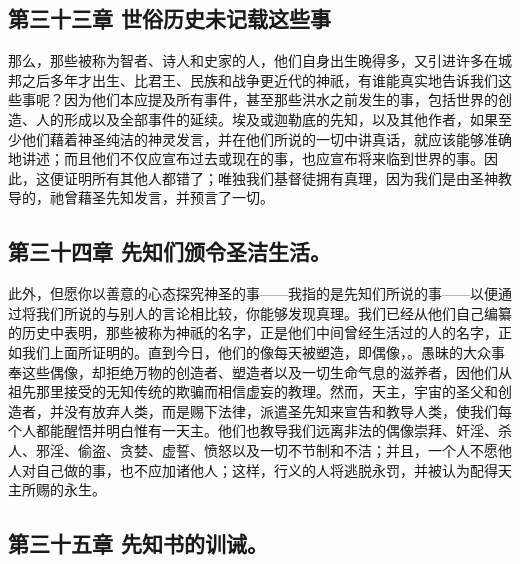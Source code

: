 
\subsection{第三十三章 世俗历史未记载这些事}

那么，那些被称为智者、诗人和史家的人，他们自身出生晚得多，又引进许多在城邦之后多年才出生、比君王、民族和战争更近代的神祇，有谁能真实地告诉我们这些事呢？因为他们本应提及所有事件，甚至那些洪水之前发生的事，包括世界的创造、人的形成以及全部事件的延续。埃及或迦勒底的先知，以及其他作者，如果至少他们藉着神圣纯洁的神灵发言，并在他们所说的一切中讲真话，就应该能够准确地讲述；而且他们不仅应宣布过去或现在的事，也应宣布将来临到世界的事。因此，这便证明所有其他人都错了；唯独我们基督徒拥有真理，因为我们是由圣神教导的，祂曾藉圣先知发言，并预言了一切。\par


\subsection{第三十四章 先知们颁令圣洁生活。}

此外，但愿你以善意的心态探究神圣的事——我指的是先知们所说的事——以便通过将我们所说的与别人的言论相比较，你能够发现真理。我们已经从他们自己编纂的历史中表明，那些被称为神祇的名字，正是他们中间曾经生活过的人的名字，正如我们上面所证明的。直到今日，他们的像每天被塑造，即偶像，。愚昧的大众事奉这些偶像，却拒绝万物的创造者、塑造者以及一切生命气息的滋养者，因他们从祖先那里接受的无知传统的欺骗而相信虚妄的教理。然而，天主，宇宙的圣父和创造者，并没有放弃人类，而是赐下法律，派遣圣先知来宣告和教导人类，使我们每个人都能醒悟并明白惟有一天主。他们也教导我们远离非法的偶像崇拜、奸淫、杀人、邪淫、偷盗、贪婪、虚誓、愤怒以及一切不节制和不洁；并且，一个人不愿他人对自己做的事，也不应加诸他人；这样，行义的人将逃脱永罚，并被认为配得天主所赐的永生。\par


\subsection{第三十五章 先知书的训诫。}

